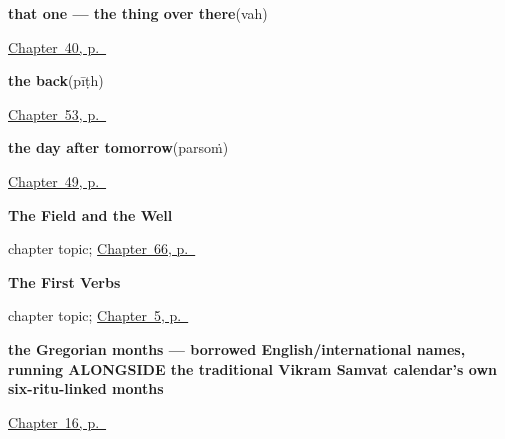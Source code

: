 \noindent\begin{minipage}[t]{\linewidth}
\raggedright
\textbf{that one — the thing over there}\enspace\emph{}\enspace(vah)\par
\footnotesize \hyperref[ch:hi-pointing-and-asking]{Chapter~40, p.~\pageref*{ch:hi-pointing-and-asking}}
\end{minipage}\par\smallskip

\noindent\begin{minipage}[t]{\linewidth}
\raggedright
\textbf{the back}\enspace\emph{}\enspace(pīṭh)\par
\footnotesize \hyperref[ch:hi-more-of-the-body]{Chapter~53, p.~\pageref*{ch:hi-more-of-the-body}}
\end{minipage}\par\smallskip

\noindent\begin{minipage}[t]{\linewidth}
\raggedright
\textbf{the day after tomorrow}\enspace\emph{}\enspace(parsoṁ)\par
\footnotesize \hyperref[ch:hi-taking-leave]{Chapter~49, p.~\pageref*{ch:hi-taking-leave}}
\end{minipage}\par\smallskip

\noindent\begin{minipage}[t]{\linewidth}
\raggedright
\textbf{The Field and the Well}\par
\footnotesize chapter topic; \hyperref[ch:hi-the-field-and-the-well]{Chapter~66, p.~\pageref*{ch:hi-the-field-and-the-well}}
\end{minipage}\par\smallskip

\noindent\begin{minipage}[t]{\linewidth}
\raggedright
\textbf{The First Verbs}\par
\footnotesize chapter topic; \hyperref[ch:first-verbs]{Chapter~5, p.~\pageref*{ch:first-verbs}}
\end{minipage}\par\smallskip

\noindent\begin{minipage}[t]{\linewidth}
\raggedright
\textbf{the Gregorian months — borrowed English/international names, running ALONGSIDE the traditional Vikram Samvat calendar's own six-ritu-linked months}\enspace\emph{           }\par
\footnotesize \hyperref[ch:hi-months]{Chapter~16, p.~\pageref*{ch:hi-months}}
\end{minipage}\par\smallskip

